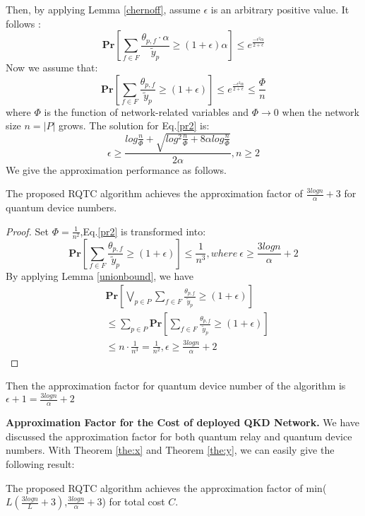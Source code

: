 Then, by applying Lemma \ref{chernoff}, assume $\epsilon$ is an arbitrary positive value. It follows :
\begin{equation}\label{pr1}
  \textbf{Pr}[\sum_{f \in F} \frac{\theta_{p,f} \cdot \alpha}{\widetilde{y}_p} \ge (1+\epsilon)\alpha] \le e^{\frac{-\epsilon^2\alpha}{2+\epsilon}}
\end{equation}
Now we assume that:
\begin{equation}\label{pr2}
  \textbf{Pr}[\sum_{f \in F} \frac{\theta_{p,f}}{\widetilde{y}_p } \ge (1+\epsilon)] \le e^{\frac{-\epsilon^2\alpha}{2+\epsilon}} \le \frac{\Phi}{n}
\end{equation}
where $\Phi$ is the function of network-related variables and $\Phi \rightarrow 0$ when the network size $n = |P|$ grows. The solution for Eq.\ref{pr2} is:
\begin{equation}\label{solution}
  \epsilon \ge \frac{log\frac{n}{\Phi}+\sqrt{log^2\frac{n}{\Phi}+8\alpha log\frac{n}{\Phi}}}{2\alpha},n \ge 2
\end{equation}
We give the approximation performance as follows.
\begin{theorem}\label{the:y}
The proposed RQTC algorithm achieves the approximation factor of $\frac{3logn}{\alpha}+3$ for quantum device numbers.
\end{theorem}
\begin{proof}
Set $\Phi = \frac{1}{n^2}$,Eq.\ref{pr2} is transformed into:
\begin{equation}
    \textbf{Pr}[\sum_{f \in F} \frac{\theta_{p,f}}{\widetilde{y}_p } \ge (1+\epsilon)] \le \frac{1}{n^3},where \ \epsilon \ge \frac{3logn}{\alpha}+2
\end{equation}
By applying Lemma \ref{unionbound}, we have
\begin{equation}
\begin{aligned}
    &\textbf{Pr}[\bigvee_{p \in P}\sum_{f \in F} \frac{\theta_{p,f}}{\widetilde{y}_p} \ge (1+\epsilon)]\\ &\le \sum_{p \in P}\textbf{Pr}[\sum_{f \in F} \frac{\theta_{p,f}}{\widetilde{y}_p } \ge (1+\epsilon)]\\
    &\le n\cdot \frac{1}{n^3} = \frac{1}{n^2}, \epsilon \ge \frac{3logn}{\alpha}+2
\end{aligned}
\end{equation}
\end{proof}

Then the approximation factor for quantum device number of the algorithm is $\epsilon + 1 = \frac{3logn}{\alpha}+2$


\textbf{Approximation Factor for the Cost of deployed QKD Network.}
We have discussed the approximation factor for both quantum relay and quantum device numbers. With Theorem \ref{the:x} and Theorem \ref{the:y}, we can easily give the following result:
\begin{theorem}
	The proposed RQTC algorithm achieves the approximation factor of  min($L(\frac{3logn}{L}+3)$,$\frac{3logn}{\alpha}+3$) for total cost $C$.
\end{theorem}



